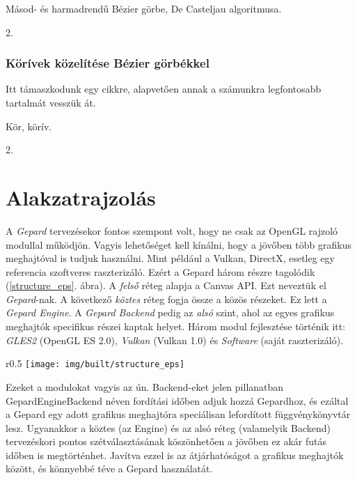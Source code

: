 \documentclass[12pt]{report}
\theoremstyle{definition}
\newcommand{\func}[1]{{\textsf{\footnotesize{#1}}}}
\newcommand{\melyikoldalra}{r}
\begin{document}
  \begin{description}[noitemsep]
    \item[Kulcsszavak] Másod- és harmadrendű Bézier görbe, De
    Casteljau algoritmusa.
    \item[Becsült oldalszám] 2.
  \end{description}

    \subsection*{Körívek közelítése Bézier görbékkel}
    \label{}

Itt támaszkodunk egy cikkre, alapvetően annak a számunkra legfontosabb
tartalmát vesszük át.

  \begin{description}[noitemsep]
    \item[Kulcsszavak] Kör, körív.
    \item[Becsült oldalszám] 2.
  \end{description}



    \chapter{Alakzatrajzolás}

A \emph{Gepard} tervezésekor fontos szempont volt, hogy ne csak az OpenGL
rajzoló modullal működjön. Vagyis lehetőséget kell kínálni, hogy a jövőben több
grafikus meghajtóval is tudjuk használni. Mint például a Vulkan, DirectX,
esetleg egy referencia szoftveres raszterizáló. Ezért a Gepard három részre
tagolódik (\ref{structure_eps}. ábra). A \emph{felső} réteg alapja a Canvas
API. Ezt neveztük el \emph{Gepard}-nak. A következő \emph{köztes} réteg fogja
össze a közös részeket. Ez lett a \emph{Gepard Engine}. A \emph{Gepard Backend}
pedig az \emph{alsó} szint, ahol az egyes grafikus meghajtók specifikus részei
kaptak helyet. Három modul fejlesztése történik itt: \emph{GLES2} (OpenGL ES
2.0), \emph{Vulkan} (Vulkan 1.0) és \emph{Software} (saját raszterizáló).
  \begin{wrapfigure}{\melyikoldalra}{0.5\textwidth}
    \texttt{[image: img/built/structure\_eps]}
    \caption{\label{structure_eps} A három fő réteg}
  \end{wrapfigure}
Ezeket a modulokat vagyis az ún. Backend-eket jelen pillanatban
\func{GepardEngineBackend} néven fordítási időben adjuk hozzá Gepardhoz, és
ezáltal a Gepard egy adott grafikus meghajtóra speciálisan lefordított
függvénykönyvtár lesz. Ugyanakkor a köztes (az Engine) és az alsó réteg
(valamelyik Backend) tervezéskori pontos szétválasztásának köszönhetően a
jövőben ez akár futás időben is megtörténhet. Javítva ezzel is az
átjárhatóságot a grafikus meghajtók között, és könnyebbé téve a Gepard
használatát.
\end{document}

